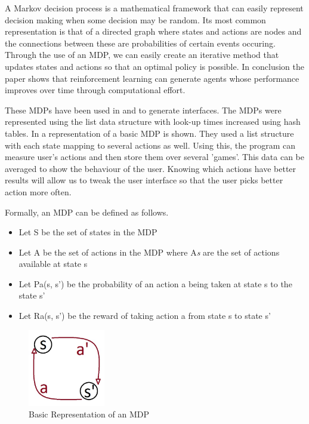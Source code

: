 \documentclass[11pt]{article}
\begin{document}
A Markov decision process is a mathematical framework that can easily represent decision making when some decision may be random. Its most common representation is that of a directed graph where states and actions are nodes and the connections between these are probabilities of certain events occuring. Through the use of an MDP, we can easily create an iterative method that updates states and actions so that an optimal policy is possible. In conclusion the paper shows that reinforcement learning can generate agents  whose performance improves over time through computational effort.\citep{white1991survey}
\vspace{6.0 mm}

These MDPs have been used in \citep{ramamoorthy2013latent} and \citep{rosman2014user} to generate interfaces. The MDPs were represented using the list data structure with look-up times increased using hash tables. In \citep{andrade2005challenge} a representation of a basic MDP is shown. They used a list structure with each state mapping to several actions as well. Using this, the program can measure user's actions and then store them over several 'games'. This data can be averaged to show the behaviour of the user. Knowing which actions have better results will allow us to tweak the user interface so that the user picks better action more often.
\vspace{6.0 mm}

Formally, an MDP can be defined as follows. 
\begin{itemize}
	\item Let S be the set of states in the MDP
	\item Let A be the set of actions in the MDP where A\textit{s} are the set of actions available at state s
	\item Let Pa(s, s') be the probability of an action a being taken at state s to the state s'
	\item Let Ra(s, s') be the reward of taking action a from state s to state s'
\end{itemize}
\vspace{6.0 mm}

\begin{figure}[h!]
    \centering
    \includegraphics[width=0.3\textwidth]{MDP.jpg}
    \caption{Basic Representation of an MDP}
\end{figure}
\vspace{6.0 mm}
\end{document}
